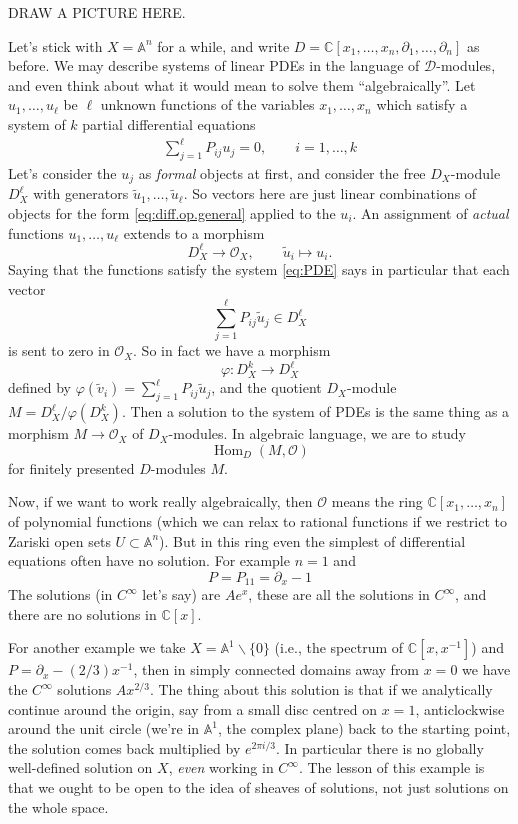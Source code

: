 \documentclass[12pt]{article}
\theoremstyle{plain}
\theoremstyle{definition}
\numberwithin{equation}{section}
\DeclareMathOperator{\Hom}{Hom}
\newcommand{\wtil}[1]{\widetilde{#1}}
\newcommand{\bbA}{\mathbb{A}}
\newcommand{\C}{\mathbb{C}}
\newcommand{\CD}{\mathcal{D}}
\newcommand{\OO}{\mathcal{O}}
\begin{document}
DRAW A PICTURE HERE.



Let's stick with $X = \bbA^n$ for a while, and write $D = \C[x_1, \ldots, x_n, \partial_1, \ldots, \partial_n]$ as before. We may describe systems of linear PDEs in the language of $\CD$-modules, and even think about what it would mean to solve them ``algebraically''. Let $u_1, \ldots, u_\ell$ be $\ell$ unknown functions of the variables $x_1, \ldots, x_n$ which satisfy a system of $k$ partial differential equations
\begin{align}\label{eq:PDE}
\sum_{j=1}^\ell P_{ij} u_j = 0, \qquad i = 1, \ldots, k
\end{align}
Let's consider the $u_j$ as \emph{formal} objects at first, and consider the free $D_X$-module $D_X^\ell$ with generators $\wtil u_1, \ldots, \wtil u_\ell$. So vectors here are just linear combinations of objects for the form \eqref{eq:diff.op.general} applied to the $u_i$. An assignment of \emph{actual} functions $u_1, \ldots, u_\ell$ extends to a morphism
\[
D_X^\ell \rightarrow \OO_X, \qquad \wtil u_i \mapsto u_i.
\]
Saying that the functions satisfy the system \eqref{eq:PDE} says in particular that each vector
\[
\sum_{j=1}^\ell P_{ij} \wtil u_j \in D_X^\ell
\]
is sent to zero in $\OO_X$. So in fact we have a morphism
\[
\varphi : D_X^k \rightarrow D_X^\ell
\]
defined by $\varphi(\wtil v_i) = \sum_{j=1}^\ell P_{ij} \wtil u_j$, and the quotient $D_X$-module $M = D_X^\ell / \varphi(D_X^k)$. Then a solution to the system of PDEs is the same thing as a morphism $M \rightarrow \OO_X$ of $D_X$-modules. In algebraic language, we are to study
\[
\Hom_{D}(M, \OO)
\]
for finitely presented $D$-modules $M$.

Now, if we want to work really algebraically, then $\OO$ means the ring $\C[x_1, \ldots, x_n]$ of polynomial functions (which we can relax to rational functions if we restrict to Zariski open sets $U \subset \bbA^n$). But in this ring even the simplest of differential equations often have no solution. For example $n=1$ and
\[
P = P_{11} = \partial_x - 1
\]
The solutions (in $C^\infty$ let's say) are $A e^x$, these are all the solutions in $C^\infty$, and there are no solutions in $\C[x]$.

For another example we take $X = \bbA^1 \backslash \{0\}$ (i.e., the spectrum of $\C[x, x^{-1}]$) and $P = \partial_x - (2/3)x^{-1}$, then in simply connected domains away from $x = 0$ we have the $C^\infty$ solutions $A x^{2/3}$. The thing about this solution is that if we analytically continue around the origin, say from a small disc centred on $x=1$, anticlockwise around the unit circle (we're in $\bbA^1$, the complex plane) back to the starting point, the solution comes back multiplied by $e^{2\pi i / 3}$. In particular there is no globally well-defined solution on $X$, \emph{even} working in $C^\infty$. The lesson of this example is that we ought to be open to the idea of sheaves of solutions, not just solutions on the whole space.
\end{document}
